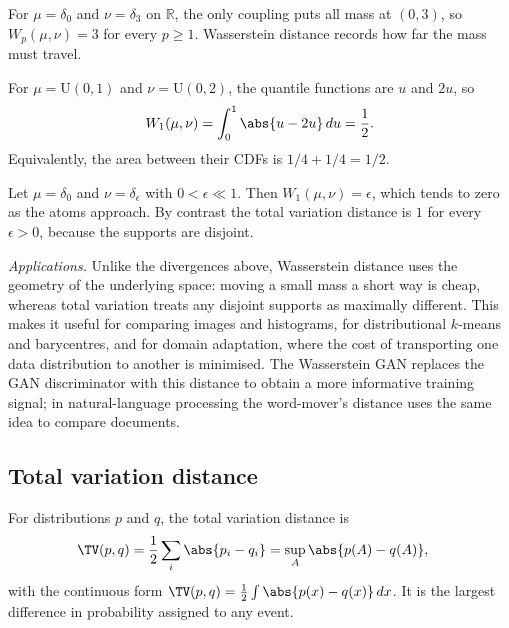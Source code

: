 \documentclass[a4paper, 12pt]{book}
\begin{document}
\begin{example}
    For $\mu=\delta_0$ and $\nu=\delta_3$ on $\mathbb{R}$, the only coupling puts all mass at $(0,3)$, so $W_p(\mu,\nu)=3$ for every $p\geq1$. Wasserstein distance records how far the mass must travel.
\end{example}

\begin{example}
    For $\mu=\mathrm{U}(0,1)$ and $\nu=\mathrm{U}(0,2)$, the quantile functions are $u$ and $2u$, so
    \begin{align}
        W_1(\mu,\nu)=\int_0^1 \abs{u-2u}\,du=\frac12.
    \end{align}
    Equivalently, the area between their CDFs is $1/4+1/4=1/2$.
\end{example}

\begin{example}
    Let $\mu=\delta_0$ and $\nu=\delta_\epsilon$ with $0<\epsilon\ll1$. Then $W_1(\mu,\nu)=\epsilon$, which tends to zero as the atoms approach. By contrast the total variation distance is $1$ for every $\epsilon>0$, because the supports are disjoint.
\end{example}

\emph{Applications.} Unlike the divergences above, Wasserstein distance uses the geometry of the underlying space: moving a small mass a short way is cheap, whereas total variation treats any disjoint supports as maximally different. This makes it useful for comparing images and histograms, for distributional $k$-means and barycentres, and for domain adaptation, where the cost of transporting one data distribution to another is minimised. The Wasserstein GAN replaces the GAN discriminator with this distance to obtain a more informative training signal; in natural-language processing the word-mover's distance uses the same idea to compare documents.

\subsection{Total variation distance}
\begin{definition}
    For distributions $p$ and $q$, the total variation distance is
    \begin{align}
        \TV(p,q) &= \frac12\sum_i \abs{p_i-q_i}
        = \sup_{A}\abs{p(A)-q(A)},
    \end{align}
    with the continuous form $\TV(p,q)=\frac12\int\abs{p(x)-q(x)}\,dx$. It is the largest difference in probability assigned to any event.
\end{definition}
\end{document}

